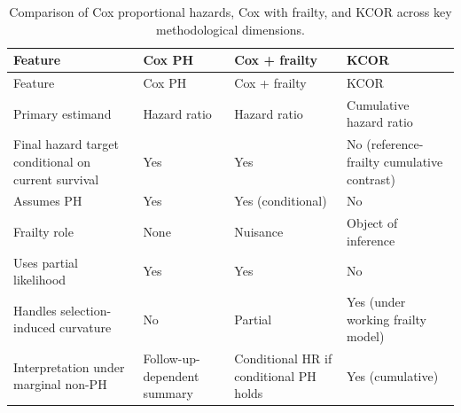 \documentclass[
]{article}
\begin{document}
\begin{longtable}[]{@{}
  >{\raggedright\arraybackslash}p{}
  >{\raggedright\arraybackslash}p{}
  >{\raggedright\arraybackslash}p{}
  >{\raggedright\arraybackslash}p{}@{}}
\caption{Comparison of Cox proportional hazards, Cox with frailty, and KCOR across key methodological dimensions.}\label{tbl:cox_vs_kcor}\tabularnewline
\toprule\noalign{}
\begin{minipage}[b]{\linewidth}\raggedright
Feature
\end{minipage} & \begin{minipage}[b]{\linewidth}\raggedright
Cox PH
\end{minipage} & \begin{minipage}[b]{\linewidth}\raggedright
Cox + frailty
\end{minipage} & \begin{minipage}[b]{\linewidth}\raggedright
KCOR
\end{minipage} \\
\midrule\noalign{}
\endfirsthead
\toprule\noalign{}
\begin{minipage}[b]{\linewidth}\raggedright
Feature
\end{minipage} & \begin{minipage}[b]{\linewidth}\raggedright
Cox PH
\end{minipage} & \begin{minipage}[b]{\linewidth}\raggedright
Cox + frailty
\end{minipage} & \begin{minipage}[b]{\linewidth}\raggedright
KCOR
\end{minipage} \\
\midrule\noalign{}
\endhead
\bottomrule\noalign{}
\endlastfoot
Primary estimand & Hazard ratio & Hazard ratio & Cumulative hazard ratio \\
Final hazard target conditional on current survival & Yes & Yes & No (reference-frailty cumulative contrast) \\
Assumes PH & Yes & Yes (conditional) & No \\
Frailty role & None & Nuisance & Object of inference \\
Uses partial likelihood & Yes & Yes & No \\
Handles selection-induced curvature & No & Partial & Yes (under working frailty model) \\
Interpretation under marginal non-PH & Follow-up-dependent summary & Conditional HR if conditional PH holds & Yes (cumulative) \\
\end{longtable}
\end{document}
